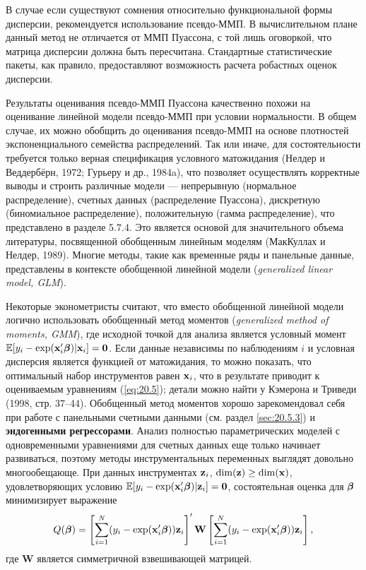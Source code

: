 В случае если существуют сомнения относительно функциональной формы дисперсии, рекомендуется использование псевдо-ММП. В вычислительном плане данный метод не отличается от ММП Пуассона, с той лишь оговоркой, что матрица дисперсии должна быть пересчитана. Стандартные статистические пакеты, как правило, предоставляют возможность расчета робастных оценок дисперсии.

Результаты оценивания псевдо-ММП Пуассона качественно похожи на оценивание линейной модели псевдо-ММП при условии нормальности. В общем случае, их можно обобщить до оценивания псевдо-ММП на основе плотностей экспоненциального семейства распределений. Так или иначе, для состоятельности требуется только верная спецификация условного матожидания (Нелдер и Веддербёрн, 1972; Гурьеру и др., 1984a), что позволяет осуществлять корректные выводы и строить различные модели --- непрерывную (нормальное распределение), счетных данных (распределение Пуассона), дискретную (биномиальное распределение), положительную (гамма распределение), что представлено в разделе 5.7.4. Это является основой для значительного объема литературы, посвященной обобщенным линейным моделям (МакКуллах и Нелдер, 1989). Многие методы, такие как временные ряды и панельные данные, представлены в контексте обобщенной линейной модели (\textit{generalized linear model, GLM}).

Некоторые эконометристы считают, что вместо обобщенной линейной модели логично использовать обобщенный метод моментов (\textit{generalized method of moments, GMM}), где исходной точкой для анализа является условный момент $\mathbb{E}[y_i - \exp(\mathbf{x}_i'\bm{\beta})|\mathbf{x}_i] = \mathbf{0}$. Если данные независимы по наблюдениям $i$ и условная дисперсия является функцией от матожидания, то можно показать, что оптимальный набор инструментов равен $\mathbf{x}_i$, что в результате приводит к оцениваемым уравнениям (\ref{eq:20.5}); детали можно найти у Кэмерона и Триведи (1998, стр. 37--44). Обобщенный метод моментов хорошо зарекомендовал себя при работе с панельными счетными данными (см. раздел \ref{sec:20.5.3}) и \textbf{эндогенными регрессорами}. Анализ полностью параметрических моделей с одновременными уравнениями для счетных данных еще только начинает развиваться, поэтому методы инструментальных переменных выглядят довольно многообещающе. При данных инструментах $\mathbf{z}_i$, $\dim (\mathbf{z}) \ge \dim(\mathbf{x})$, удовлетворяющих условию $\mathbb{E}[y_i - \exp(\mathbf{x}_i'\bm{\beta})|\mathbf{z}_i] = \mathbf{0}$, состоятельная оценка для $\bm{\beta}$ минимизирует выражение
    \begin{align}\label{eq:20.20}
    Q(\bm{\beta}) = \left[ \sum^{N}_{i = 1} (y_i - \exp(\mathbf{x}_i'\bm{\beta}))\mathbf{z}_i\right]' \mathbf{W} \left[ \sum^{N}_{i = 1} (y_i - \exp(\mathbf{x}_i'\bm{\beta}))\mathbf{z}_i\right],
    \end{align}
где $\mathbf{W}$ является симметричной взвешивающей матрицей.

